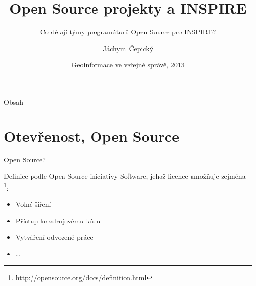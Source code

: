 \documentclass[xcolor=dvipsnames]{beamer}
\title[Open Source] %
{Open Source projekty a INSPIRE}
\subtitle {Co dělají týmy programátorů Open Source pro INSPIRE?}
\author[J. Čepický] %
{Jáchym~Čepický\inst{1}}
\institute %
{
  \inst{1}%
  Help Service - Remote Sensing s.r.o. \\
  Benešov\\
  \url{http://hsrs.cz}\\
  \
}
\date[27.5.2013-28.5.2013] %
{Geoinformace ve veřejné správě, 2013}
\begin{document}
\begin{frame}
  \titlepage
\end{frame}

\begin{frame}{Obsah}
  \tableofcontents
\end{frame}





\section{Otevřenost, Open Source}

\begin{frame}{Open Source?}

\begin{block}{Definice podle Open Source iniciativy}
    Software, jehož licence umožňuje zejména \footnote{http://opensource.org/docs/definition.html}:
    \begin{itemize} 
        \item Volné šíření
        \item Přístup ke zdrojovému kódu
        \item Vytváření odvozené práce
        \item \dots
    \end{itemize}
\end{block}
\end{frame}
\end{document}
